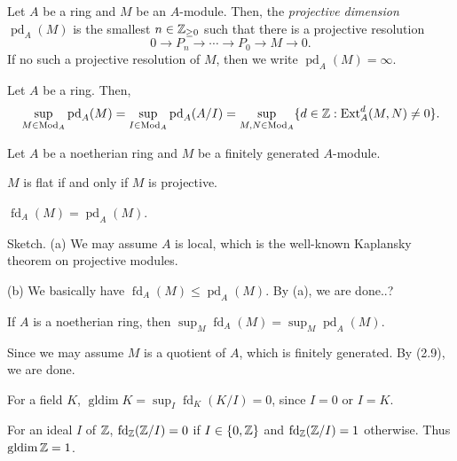 \documentclass{../../../small}
\renewcommand{\fd}{\operatorname{fd}}
\renewcommand{\pd}{\operatorname{pd}}
\newcommand{\gldim}{\operatorname{gldim}}
\begin{document}
\begin{defn*}[2.7]
Let $A$ be a ring and $M$ be an $A$-module.
Then, the \emph{projective dimension} $\pd_A(M)$ is the smallest $n\in\mathbb{Z}_{\ge0}$ such that there is a projective resolution
\[0\to P_n\to\cdots\to P_0\to M\to0.\]
If no such a projective resolution of $M$, then we write $\pd_A(M)=\infty$.
\end{defn*}

\begin{prop*}[2.8]
Let $A$ be a ring.
Then,
\[\sup_{M\in\Mod_A}\pd_A(M)=\sup_{I\in\Mod_A}\pd_A(A/I)=\sup_{M,N\in\Mod_A}\{d\in\Z:\Ext^d_A(M,N)\ne0\}.\]
\end{prop*}

\begin{prop*}[2.9]
Let $A$ be a noetherian ring and $M$ be a finitely generated $A$-module.
\begin{parts}
\item $M$ is flat if and only if $M$ is projective.
\item $\fd_A(M)=\pd_A(M)$.
\end{parts}
\end{prop*}
\begin{pf}
Sketch.
(a)
We may assume $A$ is local, which is the well-known Kaplansky theorem on projective modules.

(b)
We basically have $\fd_A(M)\le\pd_A(M)$.
By (a), we are done..?
\end{pf}

\begin{thm*}[2.10]
If $A$ is a noetherian ring, then $\sup_M\fd_A(M)=\sup_M\pd_A(M)$.
\end{thm*}
\begin{pf}
Since we may assume $M$ is a quotient of $A$, which is finitely generated.
By (2.9), we are done.
\end{pf}

\begin{ex*}[2.11]
For a field $K$, $\gldim K=\sup_I\fd_K(K/I)=0$, since $I=0$ or $I=K$.
\end{ex*}
\begin{ex*}[2.12]
For an ideal $I$ of $\mathbb{Z}$, $\fd_\Z(\Z/I)=0$ if $I\in\{0,\mathbb{Z}\}$ and $\fd_\Z(\Z/I)=1$ otherwise.
Thus $\gldim\Z=1$.
\end{ex*}
\end{document}
